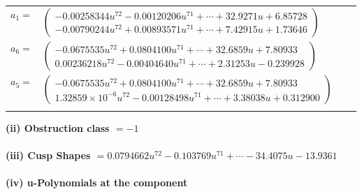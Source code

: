 \documentclass[1p]{elsarticle_modified}
\theoremstyle{definition}
\begin{document}
\begin{tabular}{m{7pt} m{180pt} m{7pt} m{180pt} }
\flushright $a_{1}=$&$\begin{pmatrix}-0.00258344 u^{72}-0.00120206 u^{71}+\cdots+32.9271 u+6.85728\\-0.00790244 u^{72}+0.00893571 u^{71}+\cdots+7.42915 u+1.73646\end{pmatrix}$ \\
\flushright $a_{6}=$&$\begin{pmatrix}-0.0675535 u^{72}+0.0804100 u^{71}+\cdots+32.6859 u+7.80933\\0.00236218 u^{72}-0.00404640 u^{71}+\cdots+2.31253 u-0.239928\end{pmatrix}$ \\
\flushright $a_{5}=$&$\begin{pmatrix}-0.0675535 u^{72}+0.0804100 u^{71}+\cdots+32.6859 u+7.80933\\1.32859\times10^{-6} u^{72}-0.00128498 u^{71}+\cdots+3.38038 u+0.312900\end{pmatrix}$\\&\end{tabular}
\flushleft \textbf{(ii) Obstruction class $= -1$}\\~\\
\flushleft \textbf{(iii) Cusp Shapes $= 0.0794662 u^{72}-0.103769 u^{71}+\cdots-34.4075 u-13.9361$}\\~\\
\newpage\renewcommand{\arraystretch}{1}
\flushleft \textbf{(iv) u-Polynomials at the component}\newline \\
\end{document}
